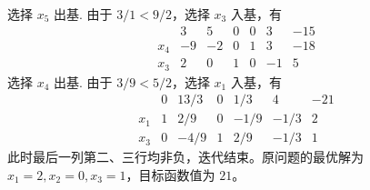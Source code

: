 选择 $x_5$ 出基. 由于 $3/1 < 9/2$，选择 $x_3$ 入基，有
$$
\begin{array}{c|ccccc|c} & 3 & 5 & 0 & 0 & 3 & -15 \\ \hline x_4 & -9 & -2 & 0 & 1 & 3 & -18 \\ x_3 & 2 & 0 & 1 & 0 & -1 & 5 \end{array}
$$
选择 $x_4$ 出基. 由于 $3/9 < 5/2$，选择 $x_1$ 入基，有
$$
\begin{array}{c|ccccc|c} & 0 & 13/3 & 0 & 1/3 & 4 & -21 \\ \hline x_1 & 1 & 2/9 & 0 & -1/9 & -1/3 & 2 \\ x_3 & 0 & -4/9 & 1 & 2/9 & -1/3 & 1 \end{array}
$$
此时最后一列第二、三行均非负，迭代结束。原问题的最优解为 $x_1 = 2, x_2 = 0, x_3 = 1$，目标函数值为 $21$。


